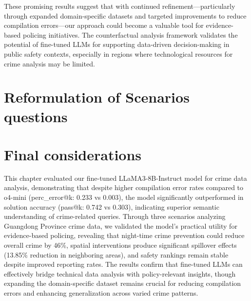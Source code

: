 These promising results suggest that with continued refinement—particularly through expanded domain-specific datasets and targeted improvements to reduce compilation errors—our approach could become a valuable tool for evidence-based policing initiatives. The counterfactual analysis framework validates the potential of fine-tuned LLMs for supporting data-driven decision-making in public safety contexts, especially in regions where technological resources for crime analysis may be limited.



\section{Reformulation of Scenarios questions} 





\section{Final considerations}

This chapter evaluated our fine-tuned LLaMA3-8B-Instruct model for crime data analysis, demonstrating that despite higher compilation error rates compared to o4-mini (perc\_error@k: 0.233 vs 0.003), the model significantly outperformed in solution accuracy (pass@k: 0.742 vs 0.303), indicating superior semantic understanding of crime-related queries. Through three scenarios analyzing Guangdong Province crime data, we validated the model's practical utility for evidence-based policing, revealing that night-time crime prevention could reduce overall crime by 46\%, spatial interventions produce significant spillover effects (13.85\% reduction in neighboring areas), and safety rankings remain stable despite improved reporting rates. The results confirm that fine-tuned LLMs can effectively bridge technical data analysis with policy-relevant insights, though expanding the domain-specific dataset remains crucial for reducing compilation errors and enhancing generalization across varied crime patterns.